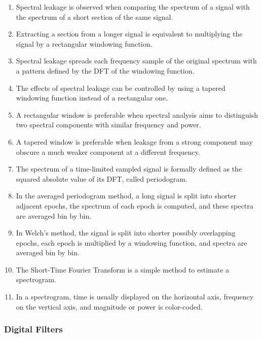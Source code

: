 \begin{enumerate}[label=\arabic*.]
    \item Spectral leakage is observed when comparing the spectrum of a signal with the spectrum of a short section of the same signal.
    
    \item Extracting a section from a longer signal is equivalent to multiplying the signal by a rectangular windowing function.
    
    \item Spectral leakage spreads each frequency sample of the original spectrum with a pattern defined by the DFT of the windowing function.
    
    \item The effects of spectral leakage can be controlled by using a tapered windowing function instead of a rectangular one.
    
    \item A rectangular window is preferable when spectral analysis aims to distinguish two spectral components with similar frequency and power.
    
    \item A tapered window is preferable when leakage from a strong component may obscure a much weaker component at a different frequency.
    
    \item The spectrum of a time-limited sampled signal is formally defined as the squared absolute value of its DFT, called periodogram.
    
    \item In the averaged periodogram method, a long signal is split into shorter adjacent epochs, the spectrum of each epoch is computed, and these spectra are averaged bin by bin.
    
    \item In Welch's method, the signal is split into shorter possibly overlapping epochs, each epoch is multiplied by a windowing function, and spectra are averaged bin by bin.
    
    \item The Short-Time Fourier Transform is a simple method to estimate a spectrogram.
    
    \item In a spectrogram, time is usually displayed on the horizontal axis, frequency on the vertical axis, and magnitude or power is color-coded.
\end{enumerate}

\subsubsection{Digital Filters}


